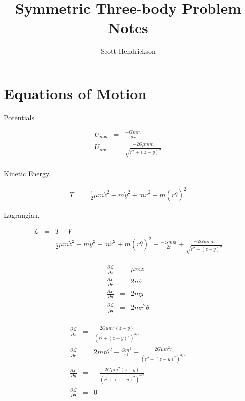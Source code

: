 \documentclass{article}
\title{Symmetric Three-body Problem Notes}
\author{Scott Hendrickson}
\begin{document}
\maketitle

\section{Equations of Motion}

\label{sec:intro}

Potentials,

\begin{eqnarray}
U_{m m} & = & \frac{-Gmm}{2r} \\
U_{\mu m} & = & \frac{-2G\mu mm}{\sqrt{r^2 + (z-y)^2}} \\
\label{eq:potentials}
\end{eqnarray}

Kinetic Energy,

\begin{eqnarray}
T & = & \frac{1}{2} \mu m \dot{z}^2 + m \dot{y}^2 + m \dot{r}^2 + m(r\dot{\theta})^2
\label{eq:potentials}
\end{eqnarray}

Lagrangian,

\begin{eqnarray}
\mathcal{L} & = & T - V \\
& = & \frac{1}{2} \mu m \dot{z}^2 + m \dot{y}^2 + m \dot{r}^2 + m(r\dot{\theta})^2 + \frac{-Gmm}{2r} +  \frac{-2G\mu mm}{\sqrt{r^2 + (z-y)^2}}
\label{eq:potentials}
\end{eqnarray}

\begin{eqnarray}
\frac{\partial{\mathcal{L}}}{\partial{ \dot{z}}} & = & \mu m \dot{z} \\
\frac{\partial{\mathcal{L}}}{\partial{ \dot{r}}} & = & 2m\dot{r} \\
\frac{\partial{\mathcal{L}}}{\partial{ \dot{y}}} & = & 2m\dot{y} \\
\frac{\partial{\mathcal{L}}}{\partial{ \dot{\theta}}} & = & 2mr^2\dot{\theta} \\
\end{eqnarray}

\begin{eqnarray}
\frac{\partial{\mathcal{L}}}{\partial{z}} & = & \frac{2G \mu m^2 (z-y)}{(r^2 + (z-y)^2)^{3/2}} \\
\frac{\partial{\mathcal{L}}}{\partial{r}} & = & 2mr\theta^2 - \frac{G m^2}{r^2} - \frac{2 G \mu m^2 r}{(r^2 + (z-y)^2)^{3/2}} \\
\frac{\partial{\mathcal{L}}}{\partial{y}} & = & - \frac{2G \mu m^2 (z-y)}{(r^2 + (z-y)^2)^{3/2}} \\
\frac{\partial{\mathcal{L}}}{\partial{\theta}} & = & 0 \\
\end{eqnarray}
\end{document}
